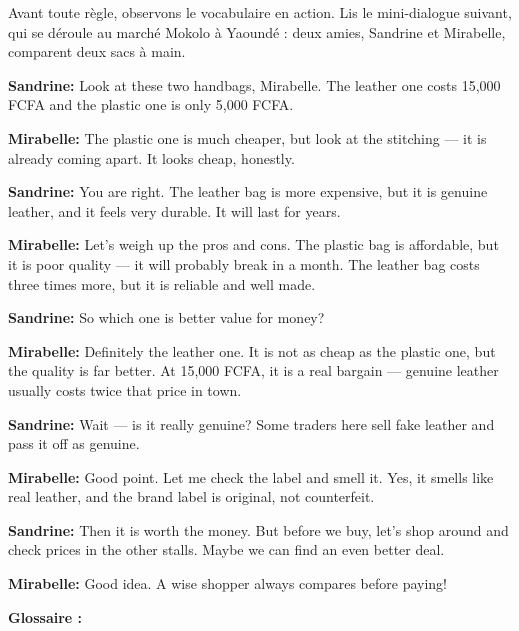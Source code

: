 \documentclass[11pt]{article}
\begin{document}
Avant toute règle, observons le vocabulaire en action. Lis le mini-dialogue suivant, qui se déroule au marché Mokolo à Yaoundé : deux amies, Sandrine et Mirabelle, comparent deux sacs à main.

\begin{textebox}
\textbf{Sandrine:} Look at these two handbags, Mirabelle. The leather one costs 15,000 FCFA and the plastic one is only 5,000 FCFA.\par
\textbf{Mirabelle:} The plastic one is much cheaper, but look at the stitching — it is already coming apart. It looks cheap, honestly.\par
\textbf{Sandrine:} You are right. The leather bag is more expensive, but it is genuine leather, and it feels very durable. It will last for years.\par
\textbf{Mirabelle:} Let's weigh up the pros and cons. The plastic bag is affordable, but it is poor quality — it will probably break in a month. The leather bag costs three times more, but it is reliable and well made.\par
\textbf{Sandrine:} So which one is better value for money?\par
\textbf{Mirabelle:} Definitely the leather one. It is not as cheap as the plastic one, but the quality is far better. At 15,000 FCFA, it is a real bargain — genuine leather usually costs twice that price in town.\par
\textbf{Sandrine:} Wait — is it really genuine? Some traders here sell fake leather and pass it off as genuine.\par
\textbf{Mirabelle:} Good point. Let me check the label and smell it. Yes, it smells like real leather, and the brand label is original, not counterfeit.\par
\textbf{Sandrine:} Then it is worth the money. But before we buy, let's shop around and check prices in the other stalls. Maybe we can find an even better deal.\par
\textbf{Mirabelle:} Good idea. A wise shopper always compares before paying!
\end{textebox}

\textbf{Glossaire :}
\end{document}
